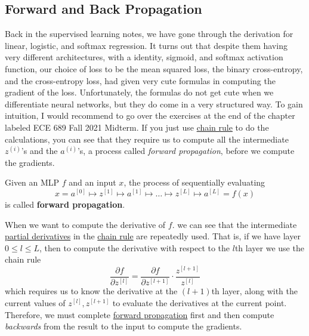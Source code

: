 \subsection{Forward and Back Propagation}

  Back in the supervised learning notes, we have gone through the derivation for linear, logistic, and softmax regression. It turns out that despite them having very different architectures, with a identity, sigmoid, and softmax activation function, our choice of loss to be the mean squared loss, the binary cross-entropy, and the cross-entropy loss, had given very cute formulas in computing the gradient of the loss. Unfortunately, the formulas do not get cute when we differentiate neural networks, but they do come in a very structured way. To gain intuition, I would recommend to go over the exercises at the end of the chapter labeled ECE 689 Fall 2021 Midterm. If you just use \hyperref[mv-thm:chain-rule]{chain rule} to do the calculations, you can see that they require us to compute all the intermediate $z^{(i)}$'s and the $a^{(i)}$'s, a process called \textit{forward propagation}, before we compute the gradients. 

  \begin{definition}
    \label{def:forward-propagation}
    Given an MLP $f$ and an input $x$, the process of sequentially evaluating 
    \begin{equation}
      x = a^{[0]} \mapsto z^{[1]} \mapsto a^{[1]} \mapsto \ldots \mapsto z^{[L]} \mapsto a^{[L]} = f(x)
    \end{equation}
    is called \textbf{forward propagation}. 
  \end{definition} 

  When we want to compute the derivative of $f$. we can see that the intermediate \hyperref[mv-def:partial-derivative]{partial derivatives} in the \hyperref[mv-thm:chain-rule]{chain rule} are repeatedly used. That is, if we have layer $0 \leq l \leq L$, then to compute the derivative with respect to the $l$th layer we use the chain rule 
  \begin{equation}
    \frac{\partial f}{\partial z^{[l]}} = \frac{\partial f}{\partial z^{[l+1]}} \cdot \frac{z^{[l+1]}}{z^{[l]}}
  \end{equation}
  which requires us to know the derivative at the $(l+1)$th layer, along with the current values of $z^{[l]}, z^{[l+1]}$ to evaluate the derivatives at the current point. Therefore, we must complete \hyperref[def:forward-propagation]{forward propagation} first and then compute \textit{backwards} from the result to the input to compute the gradients. 

